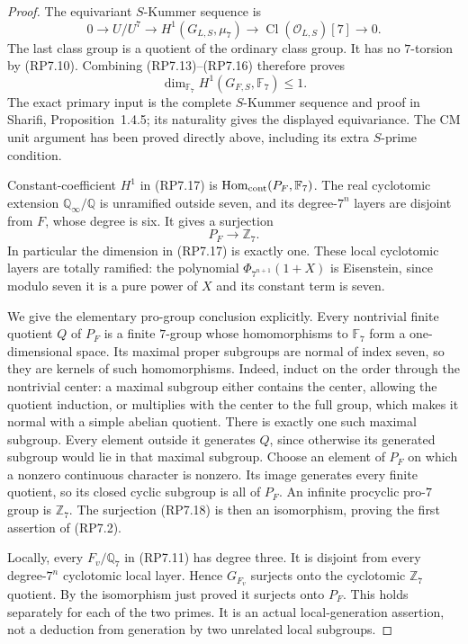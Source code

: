 \begin{proof}
The equivariant $S$-Kummer sequence is
\[
 0\longrightarrow U/U^7
 \longrightarrow H^1(G_{L,S},\mu_7)
 \longrightarrow\operatorname{Cl}(\mathcal O_{L,S})[7]
 \longrightarrow0.
 \tag{RP7.16}
\]
The last class group is a quotient of the ordinary class group.
It has no $7$-torsion by (RP7.10). Combining (RP7.13)--(RP7.16)
therefore proves
\[
                 \dim_{\mathbb F_7}H^1(G_{F,S},\mathbb F_7)
                    \leq1.
 \tag{RP7.17}
\]
The exact primary input is the complete $S$-Kummer sequence
and proof in Sharifi, Proposition~1.4.5; its naturality gives
the displayed equivariance. The CM unit argument has been
proved directly above, including its extra $S$-prime condition.

Constant-coefficient $H^1$ in (RP7.17) is
$\operatorname{Hom}_{\rm cont}(P_F,\mathbb F_7)$.
The real cyclotomic extension $\mathbb Q_\infty/\mathbb Q$
is unramified outside seven, and its degree-$7^n$ layers are
disjoint from $F$, whose degree is six. It gives a surjection
\[
                    P_F\longrightarrow\mathbb Z_7.
 \tag{RP7.18}
\]
In particular the dimension in (RP7.17) is exactly one.
These local cyclotomic layers are totally ramified: the
polynomial $\Phi_{7^{n+1}}(1+X)$ is Eisenstein, since modulo
seven it is a pure power of $X$ and its constant term is seven.

We give the elementary pro-group conclusion explicitly.
Every nontrivial finite quotient $Q$ of $P_F$ is a finite
$7$-group whose homomorphisms to $\mathbb F_7$ form a
one-dimensional space. Its maximal proper subgroups are
normal of index seven, so they are kernels of such homomorphisms.
Indeed, induct on the order through the nontrivial center:
a maximal subgroup either contains the center, allowing the
quotient induction, or multiplies with the center to the full
group, which makes it normal with a simple abelian quotient.
There is exactly one such maximal subgroup. Every element
outside it generates $Q$, since otherwise its generated
subgroup would lie in that maximal subgroup. Choose an
element of $P_F$ on which a nonzero continuous character is
nonzero. Its image generates every finite quotient, so its
closed cyclic subgroup is all of $P_F$.
An infinite procyclic pro-$7$ group is $\mathbb Z_7$.
The surjection (RP7.18) is then an isomorphism, proving the
first assertion of (RP7.2).

Locally, every $F_v/\mathbb Q_7$ in (RP7.11) has degree three.
It is disjoint from every degree-$7^n$ cyclotomic local layer.
Hence $G_{F_v}$ surjects onto the cyclotomic $\mathbb Z_7$
quotient. By the isomorphism just proved it surjects onto
$P_F$. This holds separately for each of the two primes.
It is an actual local-generation assertion, not a deduction
from generation by two unrelated local subgroups.


\end{proof}
